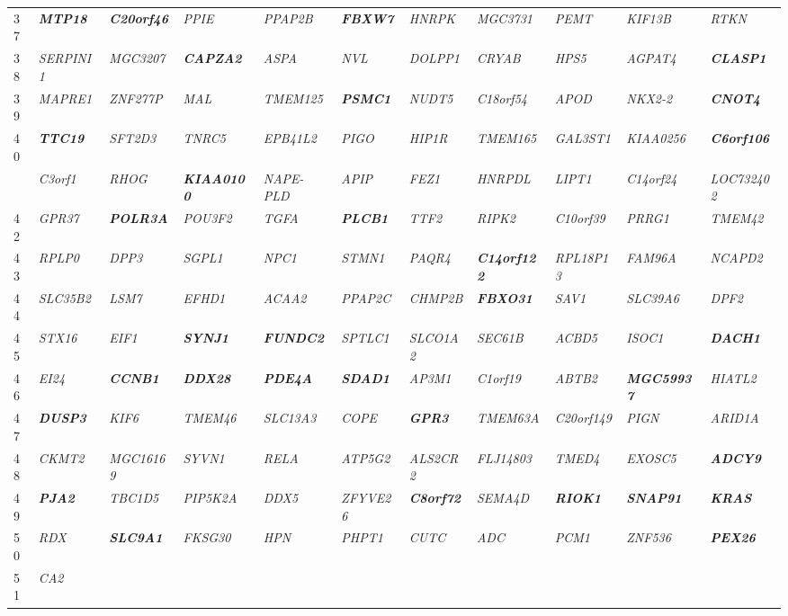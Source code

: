 \documentclass[letterpaper,12pt]{article}
\numberwithin{equation}{appendix}
\begin{document}
\begin{landscape}
{{\begin{longtable}{l >{\itshape}l >{\itshape}l >{\itshape}l >{\itshape}l >{\itshape}l >{\itshape}l >{\itshape}l >{\itshape}l >{\itshape}l >{\itshape}l}
37&{\bfseries {MTP18}}&{\bfseries {C20orf46}}&PPIE&PPAP2B&{\bfseries {FBXW7}}&HNRPK&MGC3731&PEMT&KIF13B&RTKN\tabularnewline
38&SERPINI1&MGC3207&{\bfseries {CAPZA2}}&ASPA&NVL&DOLPP1&CRYAB&HPS5&AGPAT4&{\bfseries {CLASP1}}\tabularnewline
39&MAPRE1&ZNF277P&MAL&TMEM125&{\bfseries {PSMC1}}&NUDT5&C18orf54&APOD&NKX2-2&{\bfseries {CNOT4}}\tabularnewline
40&{\bfseries {TTC19}}&SFT2D3&TNRC5&EPB41L2&PIGO&HIP1R&TMEM165&GAL3ST1&KIAA0256&{\bfseries {C6orf106}}\tabularnewline
\newpage
41&C3orf1&RHOG&{\bfseries {KIAA0100}}&NAPE-PLD&APIP&FEZ1&HNRPDL&LIPT1&C14orf24&LOC732402\tabularnewline
42&GPR37&{\bfseries {POLR3A}}&POU3F2&TGFA&{\bfseries {PLCB1}}&TTF2&RIPK2&C10orf39&PRRG1&TMEM42\tabularnewline
43&RPLP0&DPP3&SGPL1&NPC1&STMN1&PAQR4&{\bfseries {C14orf122}}&RPL18P13&FAM96A&NCAPD2\tabularnewline
44&SLC35B2&LSM7&EFHD1&ACAA2&PPAP2C&CHMP2B&{\bfseries {FBXO31}}&SAV1&SLC39A6&DPF2\tabularnewline
45&STX16&EIF1&{\bfseries {SYNJ1}}&{\bfseries {FUNDC2}}&SPTLC1&SLCO1A2&SEC61B&ACBD5&ISOC1&{\bfseries {DACH1}}\tabularnewline
46&EI24&{\bfseries {CCNB1}}&{\bfseries {DDX28}}&{\bfseries {PDE4A}}&{\bfseries {SDAD1}}&AP3M1&C1orf19&ABTB2&{\bfseries {MGC59937}}&HIATL2\tabularnewline
47&{\bfseries {DUSP3}}&KIF6&TMEM46&SLC13A3&COPE&{\bfseries {GPR3}}&TMEM63A&C20orf149&PIGN&ARID1A\tabularnewline
48&CKMT2&MGC16169&SYVN1&RELA&ATP5G2&ALS2CR2&FLJ14803&TMED4&EXOSC5&{\bfseries {ADCY9}}\tabularnewline
49&{\bfseries {PJA2}}&TBC1D5&PIP5K2A&DDX5&ZFYVE26&{\bfseries {C8orf72}}&SEMA4D&{\bfseries {RIOK1}}&{\bfseries {SNAP91}}&{\bfseries {KRAS}}\tabularnewline
50&RDX&{\bfseries {SLC9A1}}&FKSG30&HPN&PHPT1&CUTC&ADC&PCM1&ZNF536&{\bfseries {PEX26}}\tabularnewline
51&CA2&&&&&&&&&\tabularnewline
\bottomrule
\end{longtable}
}}

\end{landscape}
\end{document}
